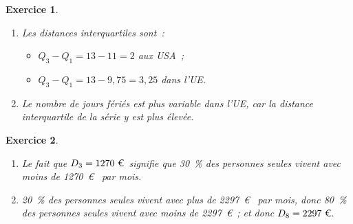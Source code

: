 \documentclass[10pt]{article}
\newtheorem{exo}{Exercice}
\begin{document}
\begin{exo}



\begin{enumerate}
\item Les distances interquartiles sont~:

\begin{itemize}
\item[\textbullet] $Q_3-Q_1=13-11=2$ aux USA~;
\item[\textbullet] $Q_3-Q_1=13-9,75=3,25$ dans l'UE.
\end{itemize}
\item Le nombre de jours fériés est plus variable dans l'UE, car la distance interquartile de la série y est plus élevée.
\end{enumerate}

\end{exo}



\begin{exo}

\begin{enumerate}
\item Le fait que $D_3=1270~\text{\euro}$ signifie que 30~\% des personnes seules vivent avec moins de 1270~\euro~{} par mois.
\item 20~\% des personnes seules vivent avec plus de 2297~\euro~{} par mois, donc 80~\% des personnes seules vivent avec moins de 2297~\euro ~; et donc $D_8=2297~\text{\euro}.$

\end{enumerate}
\end{exo}
\end{document}
